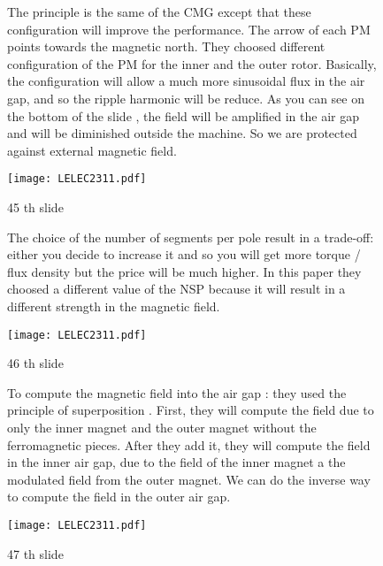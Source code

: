 \begin{figure}[H]
    \begin{minipage}{.45\linewidth}
    
The principle is the same of the CMG except that these configuration will improve the performance.
The arrow of each PM points towards the magnetic north. They choosed different configuration of the PM for the inner and the outer rotor.
Basically, the configuration will allow a much more sinusoidal flux in the air gap, and so the ripple harmonic will be reduce. As you can see on the bottom of the slide , the field will be amplified in the air gap and will be diminished outside the machine. So we are protected against external magnetic field.
 
       
    \end{minipage}
    \hfill%
    \begin{minipage}[c]{.45\linewidth}
        \centering
        \texttt{[image: LELEC2311.pdf]}
        \caption{45 th slide}
    \end{minipage}
\end{figure}




\begin{figure}[H]
    \begin{minipage}{.45\linewidth}
    The choice of the number of segments per pole result in a trade-off: either you decide to increase it and so you will get more torque / flux density but the price will be much higher. In this paper they choosed a different value of the NSP because it will result in a different strength in the magnetic field.
    \end{minipage}
    \hfill%
    \begin{minipage}[c]{.45\linewidth}
        \centering
        \texttt{[image: LELEC2311.pdf]}
        \caption{46 th slide}
    \end{minipage}
\end{figure}


\begin{figure}[H]
    \begin{minipage}{.45\linewidth}
    To compute the magnetic field into the air gap : they used the principle of superposition . First, they will compute the field due to only the inner magnet and the outer magnet without the ferromagnetic pieces. After they add it, they will compute the field in the inner air gap, due to the field of the inner magnet a the modulated field from the outer magnet. We can do the inverse way to compute the field in the outer air gap.
    \end{minipage}
    \hfill%
    \begin{minipage}[c]{.45\linewidth}
        \centering
        \texttt{[image: LELEC2311.pdf]}
        \caption{47 th slide}
    \end{minipage}
\end{figure}


